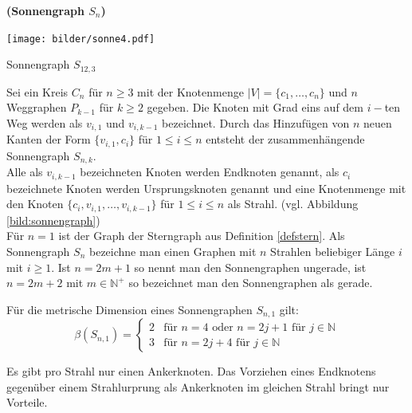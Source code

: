 \begin{defi}{\textbf{(Sonnengraph $S_{n}$)}}
\label{sun}
\begin{floatingfigure}[r]{180pt}
{\centering
\hspace*{0.1cm}
 		 \texttt{[image: bilder/sonne4.pdf]}}
   \caption{Sonnengraph $S_{12,3}$}
   \label{bild:sonnengraph}
\end{floatingfigure}
Sei ein Kreis $C_n$ für $n \geq 3$ mit der Knotenmenge $|V|=\{ c_1, \ldots , c_n \}$ und $n$ Weggraphen $P_{k-1}$ für $k \geq 2$ gegeben. Die Knoten mit Grad eins auf dem $i-$ten Weg werden als $v_{i,1}$ und $v_{i,k-1}$ bezeichnet. Durch das Hinzufügen von $n$ neuen Kanten der Form $\{v_{i,1},c_i\}$ für $1 \leq i \leq n$ entsteht der zusammenhängende Sonnengraph $S_{n,k}$.\\
Alle als $v_{i,k-1}$ bezeichneten Knoten werden Endknoten genannt, als $c_i$ bezeichnete Knoten werden Ursprungsknoten genannt und eine Knotenmenge mit den Knoten $\{c_i,v_{i,1}, \ldots ,v_{i,k-1}\}$ für $1 \leq i \leq n$ als Strahl. (vgl. Abbildung \ref{bild:sonnengraph})\\
Für $n=1$ ist der Graph der Sterngraph aus Definition \ref{defstern}. Als Sonnengraph $S_n$ bezeichne man einen Graphen mit $n$ Strahlen beliebiger Länge $i$ mit $i \geq 1$. Ist $n=2m+1$ so nennt man den Sonnengraphen ungerade, ist $n=2m+2$ mit $m \in \mathbb{N}^+$ so bezeichnet man den Sonnengraphen als gerade.
\par
\end{defi}
\newpage
\begin{lem}\cite{bases}
\label{sun1}
Für die metrische Dimension eines Sonnengraphen $S_{n,1}$ gilt:
\begin{equation}
   \beta(S_{n,1})=
   \begin{cases}
     2 & \text{f\"ur } n = 4 \text{ oder } n = 2j+1 \text{ f\"ur } j \in \mathbb{N} \\
     3 & \text{f\"ur } n = 2j+4 \text{ f\"ur } j \in \mathbb{N} 
   \end{cases}
\end{equation}
\end{lem}
\begin{lem}
\label{knotenimstrahl}
Es gibt pro Strahl nur einen Ankerknoten. Das Vorziehen eines Endknotens gegenüber einem Strahlurprung als Ankerknoten im gleichen Strahl bringt nur Vorteile.
\end{lem}
